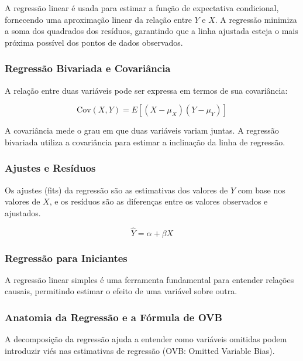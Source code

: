 \documentclass[a4paper,12pt]{article}[abntex2]
\begin{document}
A regressão linear é usada para estimar a função de expectativa condicional, fornecendo uma aproximação linear da relação entre \(Y\) e \(X\). A regressão minimiza a soma dos quadrados dos resíduos, garantindo que a linha ajustada esteja o mais próxima possível dos pontos de dados observados.

\subsubsection*{Regressão Bivariada e Covariância}

A relação entre duas variáveis pode ser expressa em termos de sua covariância:

\begin{equation}
    \text{Cov}(X, Y) = E[(X - \mu_X)(Y - \mu_Y)]
\end{equation}

A covariância mede o grau em que duas variáveis variam juntas. A regressão bivariada utiliza a covariância para estimar a inclinação da linha de regressão.

\subsubsection*{Ajustes e Resíduos}

Os ajustes (fits) da regressão são as estimativas dos valores de \(Y\) com base nos valores de \(X\), e os resíduos são as diferenças entre os valores observados e ajustados.

\begin{equation}
    \hat{Y} = \alpha + \beta X
\end{equation}

\subsubsection*{Regressão para Iniciantes}

A regressão linear simples é uma ferramenta fundamental para entender relações causais, permitindo estimar o efeito de uma variável sobre outra.

\subsubsection*{Anatomia da Regressão e a Fórmula de OVB}

A decomposição da regressão ajuda a entender como variáveis omitidas podem introduzir viés nas estimativas de regressão (OVB: Omitted Variable Bias).
\end{document}
